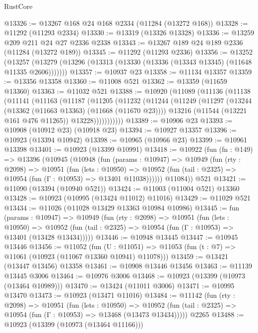 \begin{lexlean}{RustCore}
\begin{coremodule}
@13326 := @13267 @168 @24 @168 @2334 (@11284 (@13272 @168))
@13328 := @11292 (@11293 @2334)
@13330 := @13319 (@13326 @13328)
@13336 := @13259 @209 @211 @24 @27 @2336 @2338
@13343 := @13267 @189 @24 @189 @2336 (@11284 (@13272 @189))
@13345 := @11292 (@11293 @2336)
@13356 := @13252
    (@13257 (@13279 (@13296 (@13313 (@13330 (@13336 (@13343 @13345) (@11648 @11335 @2606)))))))
@13357 := @10937 @23
@13358 := @11134 @13357
@13359 := @13356 @13358
@13360 := @11008 @521
@13362 := @13359 (@11659 @13360)
@13363 := @11032 @521
@13388 := @10920
    (@11089
      (@11136
        (@11138
          (@11141
            (@11163
              (@11187
                (@11205
                  (@11232
                    (@11244
                      (@11249
                        (@11297
                          (@13244 (@13362 (@11663 @13363) (@11668 (@11670 @23))))
                          @13216
                          (@11544 (@13221 @161 @476 @11265))
                          @13228)))))))))))
@13389 := @10906 @23
@13393 := @10908 (@10912 @23) (@10918 @23)
@13394 := @10927 @13357
@13396 := @10923 (@13394 @10942)
@13398 := @10965 (@10966 @23)
@13399 := @10961 @13398
@13401 := @10923 (@13399 @10991)
@13418 := @10922
    (fun (fn : @149) =>
    @13396
      (@10945
        (@10948
          (fun (params : @10947) =>
          @10949
            (fun (rty : @2098) =>
            @10951
              (fun (lets : @10950) =>
              @10952 (fun (tail : @2325) => @10954 (fun (Γ : @10953) => @13401 @11038))))))
        @11084))
    @521
@13421 := @11090 (@13394 (@10940 @521))
@13424 := @11003 (@11004 @521) @13360
@13428 := @10923 (@10995 (@13424 @11012) @11016)
@13429 := @11029 @521
@13434 := @11026 (@11028 @13429 @13363 @10984 @10986)
@13445 := fun (params : @10947) =>
  @10949
    (fun (rty : @2098) =>
    @10951
      (fun (lets : @10950) =>
      @10952 (fun (tail : @2325) => @10954 (fun (Γ : @10953) => @13401 (@13428 @13434)))))
@13446 := @10948 @13445
@13447 := @10945 @13446
@13456 := @11052
    (fun (U : @11051) => @11053 (fun (t : @7) => @11061 (@10923 (@11067 @13360 @10941) @11078)))
@13459 := @13421 (@13447 @13456) @13358
@13461 := @10908 @13446 @13456
@13463 := @11139 @13445 @3006
@13464 := @10976 @3006
@13468 := @10923 (@13399 (@10973 (@13464 @10989)))
@13470 := @13424 (@11011 @3006)
@13471 := @10995 @13470
@13473 := @10923 (@13471 @11016)
@13484 := @11142
    (fun (rty : @2098) =>
    @10951
      (fun (lets : @10950) =>
      @10952 (fun (tail : @2325) => @10954 (fun (Γ : @10953) => @13468 (@13473 @13434)))))
    @2265
@13488 := @10923 (@13399 (@10973 (@13464 @11166)))

\end{coremodule}
\end{lexlean}
